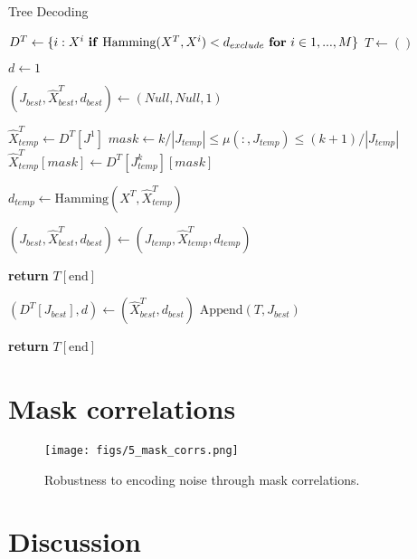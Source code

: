 \documentclass{article}
\begin{document}
\begin{algorithm}
\caption{Tree Decoding}

\begin{algorithmic}[0]
\State $D^T \gets \{i: X^i \textrm{ \textbf{if} } \textrm{Hamming}(X^T, X^i) < d_{exclude} \textrm{ \textbf{for} } i \in 1, ..., M\}$
\State $T \gets ()$

\State $d \gets 1$
    

    \State $(J_{best}, \hat{X}^T_{best}, d_{best}) \gets (Null, Null, 1)$
    
        
        \State $\hat{X}^T_{temp} \gets D^T[J^1]$
            \State $mask \gets k/|J_{temp}| \leq \mu(:, J_{temp}) \leq (k+1)/|J_{temp}|$
            \State $\hat{X}^T_{temp}[mask] \gets D^T[J^k_{temp}][mask]$
        \EndFor
        
        \State $d_{temp} \gets \textrm{Hamming}(X^T, \hat{X}^T_{temp})$
        
            \State $(J_{best}, \hat{X}^T_{best}, d_{best}) \gets (J_{temp}, \hat{X}^T_{temp}, d_{temp})$
        \EndIf
    \EndFor
    
        \State \textbf{return} $T[\textrm{end}]$
        
    \Else
        \State $(D^T[J_{best}], d) \gets (\hat{X}^T_{best}, d_{best})$
        \State $\textrm{Append}(T, J_{best})$
    \EndIf

\EndWhile

\State \textbf{return} $T[\textrm{end}]$
\EndFunction

\end{algorithmic}
\end{algorithm}

\section{Mask correlations}

\begin{figure}[!t]
    \centering
    \texttt{[image: figs/5\_mask\_corrs.png]}
    \caption{Robustness to encoding noise through mask correlations.}
 \end{figure}

\section{Discussion}
\end{document}
